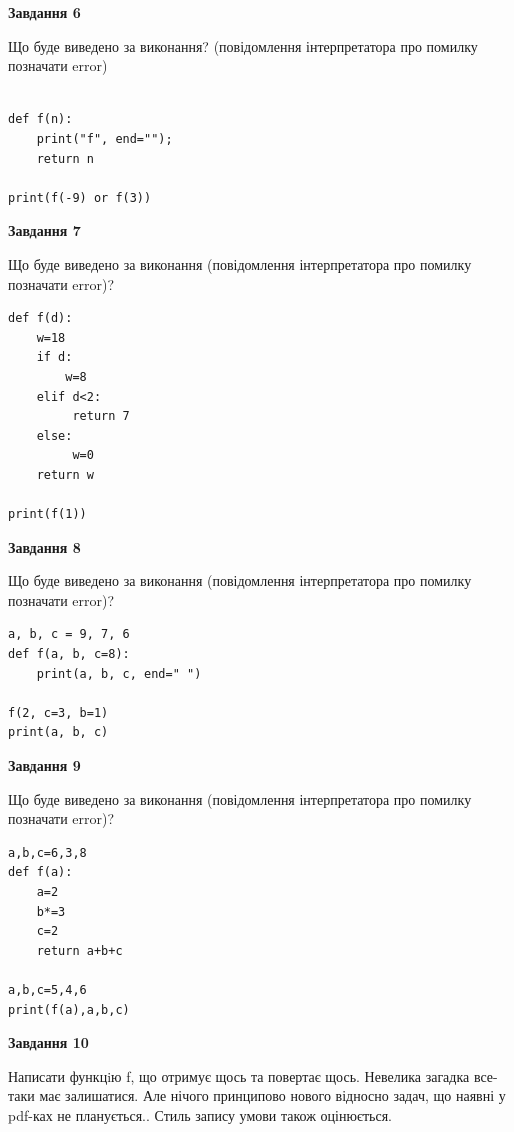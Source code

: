 \documentclass[12pt, ukrainian]{article}
\begin{document}
{\begin {large}
{\begin {center}\textbf{Завдання 6}\end {center}}

Що буде виведено за виконання? (повідомлення інтерпретатора про помилку позначати error)\par
\begin{verbatim}

def f(n):
    print("f", end="");
    return n

print(f(-9) or f(3))
\end{verbatim}

{\begin {center}\textbf{Завдання 7}\end {center}}

Що буде виведено за виконання (повідомлення інтерпретатора про помилку позначати error)?\par
\begin{verbatim}
def f(d):
    w=18
    if d: 
        w=8
    elif d<2:
         return 7
    else:
         w=0
    return w

print(f(1))
\end{verbatim}

{\begin {center}\textbf{Завдання 8}\end {center}}

Що буде виведено за виконання (повідомлення інтерпретатора про помилку позначати error)?\par
\begin{verbatim}
a, b, c = 9, 7, 6
def f(a, b, c=8):
    print(a, b, c, end=" ")

f(2, c=3, b=1)
print(a, b, c)
\end{verbatim}

{\begin {center}\textbf{Завдання 9}\end {center}}

Що буде виведено за виконання (повідомлення інтерпретатора про помилку позначати error)?\par
\begin{verbatim}
a,b,c=6,3,8
def f(a):
    a=2
    b*=3
    c=2
    return a+b+c

a,b,c=5,4,6
print(f(a),a,b,c)
\end{verbatim}

{\begin {center}\textbf{Завдання 10}\end {center}}


Написати функцiю f, що отримує щось та повертає щось. Невелика загадка все-таки має залишатися. Але нічого принципово нового відносно задач, що наявні у pdf-ках не планується.. Стиль запису умови також оцінюється.\par
\end {large}}
\newpage
\end{document}

